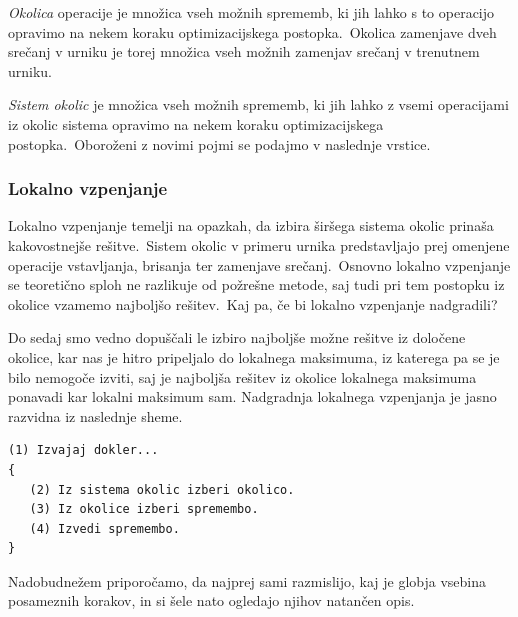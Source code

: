 \documentclass[a4paper,10pt]{article}
\begin{document}
\emph{Okolica} operacije je množica vseh možnih sprememb, ki jih lahko s to operacijo
opravimo na nekem koraku optimizacijskega postopka.\ Okolica zamenjave dveh srečanj v urniku
je torej množica vseh možnih zamenjav srečanj v trenutnem urniku.

\emph{Sistem okolic} je množica vseh možnih sprememb, ki jih lahko z vsemi operacijami iz
okolic sistema opravimo na nekem koraku optimizacijskega postopka.\ Oboroženi z novimi pojmi
se podajmo v naslednje vrstice.

\subsubsection{Lokalno vzpenjanje}

Lokalno vzpenjanje temelji na opazkah, da izbira širšega sistema okolic prinaša kakovostnejše
rešitve.\ Sistem okolic v primeru urnika predstavljajo prej omenjene operacije vstavljanja,
brisanja ter zamenjave srečanj.\ Osnovno lokalno vzpenjanje se teoretično sploh ne razlikuje
od požrešne metode, saj tudi pri tem postopku iz okolice vzamemo najboljšo rešitev.\ Kaj pa,
če bi lokalno vzpenjanje nadgradili?

Do sedaj smo vedno dopuščali le izbiro najboljše možne rešitve iz določene okolice, kar nas
je hitro pripeljalo do lokalnega maksimuma, iz katerega pa se je bilo nemogoče izviti, saj
je najboljša rešitev iz okolice lokalnega maksimuma ponavadi kar lokalni maksimum sam.
Nadgradnja lokalnega vzpenjanja je jasno razvidna iz naslednje sheme.

\begin{verbatim}
(1) Izvajaj dokler...
{
   (2) Iz sistema okolic izberi okolico.
   (3) Iz okolice izberi spremembo.
   (4) Izvedi spremembo.
}
\end{verbatim}

Nadobudnežem priporočamo, da najprej sami razmislijo, kaj je globja vsebina posameznih
korakov, in si šele nato ogledajo njihov natančen opis.
\end{document}

